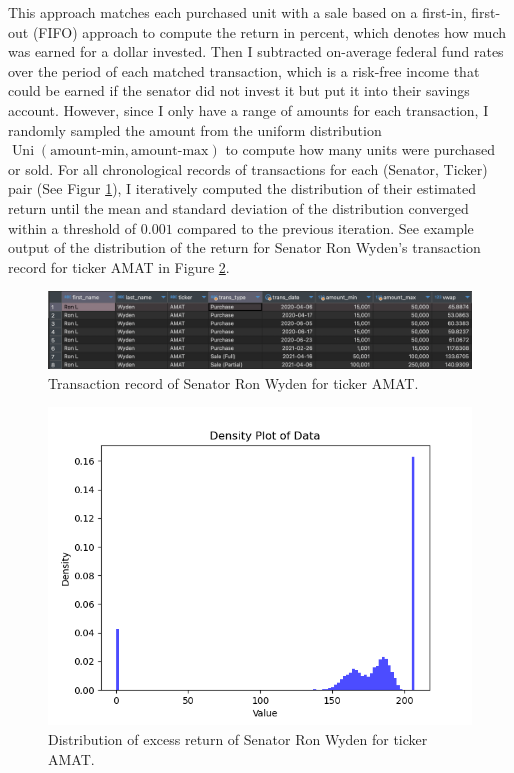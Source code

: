 \documentclass[12pt,letterpaper]{article}
\begin{document}
This approach matches each purchased unit with a sale based on a first-in, first-out (FIFO) approach to compute the return in percent, which denotes how much was earned for a dollar invested. Then I subtracted on-average federal fund rates over the period of each matched transaction, which is a risk-free income that could be earned if the senator did not invest it but put it into their savings account. However, since I only have a range of amounts for each transaction, I randomly sampled the amount from the uniform distribution $\operatorname*{Uni}(\text{amount-min}, \text{amount-max})$ to compute how many units were purchased or sold. For all chronological records of transactions for each (Senator, Ticker) pair (See Figur \ref{fig:transaction_record}), I iteratively computed the distribution of their estimated return until the mean and standard deviation of the distribution converged within a threshold of $0.001$ compared to the previous iteration. 
See example output of the distribution of the return for Senator Ron Wyden's transaction record for ticker AMAT in Figure \ref{fig:dist}.

\begin{figure}[h]
  \centering
  \includegraphics[width=1\textwidth]{imgs/RW-AMAT/RW-Trans.png}
  \caption{Transaction record of Senator Ron Wyden for ticker AMAT.}
  \label{fig:transaction_record}
\end{figure}

\begin{figure}[h]
  \centering
  \includegraphics[width=1\textwidth]{imgs/RW-AMAT/RW-AMAT.png}
  \caption{Distribution of excess return of Senator Ron Wyden for ticker AMAT.}
  \label{fig:dist}
\end{figure}
\end{document}
